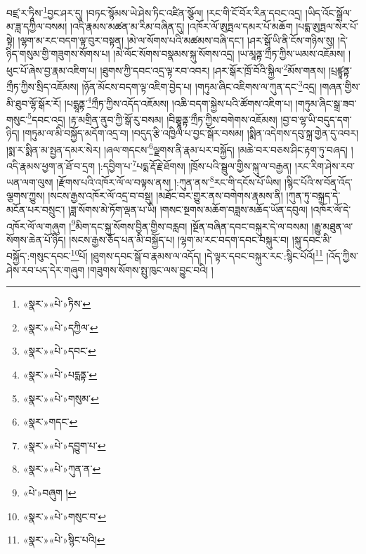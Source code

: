 བཛྲ་ར་ཏཱིས་\footnote{«སྣར་»«པེ་»ཏིས་}བྱང་ཤར་དུ། །བཏང་སྙོམས་ཡེ་ཤེས་ཏིང་འཛིན་སྩོལ། །རང་གི་ངོ་བོར་རིན་དབང་འདྲ། །ཡིད་འོང་སྒྲོལ་མ་ཟླ་དཀྱིལ་བསམ། །འདི་རྣམས་མཚན་མ་རིམ་བཞིན་དུ། །འཁོར་ལོ་ཨུཏྤལ་དམར་པོ་མཆོག །པདྨ་ཨུཏྤལ་སེར་པོ་སྟེ། །ལྷག་མ་རང་བདག་ལྟ་བུར་བསྟན། །མེ་ལ་སོགས་པའི་མཚམས་བཞི་དང་། །ཤར་སྒོ་ཡི་ནི་ངོས་གཉིས་སུ། །དེ་ཉིད་གསུམ་གྱི་གཟུགས་སོགས་པ། །མེ་ལོང་སོགས་བསྣམས་སྐུ་སོགས་འདྲ། །ཡ་མཱནྟ་ཀྲྀཏ་ཀྱིས་ཡམས་འཇོམས། །ཕུང་པོ་ཞེས་བྱ་རྣམ་འཇིག་པ། །ཐུགས་ཀྱི་དབང་འདྲ་ལྟ་རབ་འབར། །ཤར་སྒོར་ཁྲོ་བོའི་སྐྱིལ་\footnote{«སྣར་»«པེ་»དཀྱིལ་}མོས་གནས། །པྲཛྙཱནྟ་ཀྲྀཏ་ཀྱིས་སྲིད་འཇོམས། །ཉོན་མོངས་བདག་ལྟ་འཇིག་བྱེད་པ། །གཏུམ་ཞིང་འཇིགས་ལ་ཀུན་དང་\footnote{«སྣར་»«པེ་»དབང་}འདྲ། །གཞན་གྱིས་མི་ཐུབ་ལྷོ་སྒོར་རོ། །པདྨཱནྟ་\footnote{«སྣར་»«པེ་»པདྨནྟ་}ཀྲྀཏ་ཀྱིས་འདོད་འཇོམས། །འཆི་བདག་སྐྱེས་པའི་ཚོགས་འཇིག་པ། །གཏུམ་ཞིང་སྒྲ་ཟབ་གསུང་\footnote{«སྣར་»«པེ་»གསུམ་}དབང་འདྲ། །རྟ་མགྲིན་ནུབ་ཀྱི་སྒོ་རུ་བསམ། །བིགྷྣཱནྟ་ཀྲྀཏ་ཀྱིས་བགེགས་འཇོམས། །བྱ་བ་ལྷ་ཡི་བདུད་དག་ཉིད། །གཏུམ་ལ་མི་བསྐྱོད་མདོག་འདྲ་བ། །བདུད་རྩི་འཁྱིལ་པ་བྱང་སྒོར་བསམ། །སྨིན་འདེགས་དབུ་སྐྲ་གྱེན་དུ་འབར། །སྨ་ར་སྨིན་མ་སྤྱན་དམར་སེར། །ཞལ་གདངས་\footnote{«སྣར་»གདང་}ལྗགས་ནི་རྣམ་པར་བསྐྱོད། །མཆེ་བར་བཅས་ཤིང་རྟག་ཏུ་བཞད། །འདི་རྣམས་ཕྱག་ན་ཐོ་བ་དྲག །:དབྱིག་པ་\footnote{«སྣར་»«པེ་»དབྱུག་པ་}པདྨ་རྡོ་རྗེ་ཐོགས། །ཁྲོས་པའི་སྦྲུལ་གྱིས་སྐུ་ལ་བརྒྱན། །རང་རིག་ཤེས་རབ་ཡན་ལག་ལུས། །རྫོགས་པའི་འཁོར་ལོ་ལ་བལྟས་ནས། །:ཀུན་ནས་\footnote{«སྣར་»«པེ་»ཀུན་ན་}རང་གི་དངོས་པོ་ཡིས། །སྙིང་པོའི་ས་བོན་འོད་ལྕགས་ཀྱུས། །སངས་རྒྱས་འཁོར་ལོ་འདྲ་བ་བསྡུ། །མཐོང་བར་གྱུར་ནས་བགེགས་རྣམས་ནི། །ཀུན་ཏུ་བསྐྲད་དེ་མངོན་པར་བསྲུང་། །ཟླ་སོགས་མེ་ཏོག་ལྡན་པ་ཡི། །གསང་སྔགས་མཆོག་བཟླས་མཆོད་ཡོན་དབུལ། །འཁོར་ལོ་དེ་འཁོར་ལོ་ལ་གཞུག །\footnote{«པེ་»བཞུག །}མིག་དང་སྐུ་སོགས་བྱིན་གྱིས་བརླབ། །སྔོན་བཞིན་དབང་བསྐུར་དེ་ལ་བསམ། །རྒྱུ་མཐུན་ལ་སོགས་ཆེན་པོ་ཉིད། །སངས་རྒྱས་ཅོད་པན་མི་བསྐྱོད་པ། །ལྷག་མ་རང་བདག་དབང་བསྐུར་བ། །སྐུ་དབང་མི་བསྐྱོད་:གསུང་དབང་\footnote{«སྣར་»«པེ་»གསུང་བ་}པོ། །ཐུགས་དབང་སྒོ་བ་རྣམས་ལ་འདོད། །དེ་ལྟར་དབང་བསྐུར་རང་:སྙིང་པོའོ།\footnote{«སྣར་»«པེ་»སྙིང་པའི།} །འོད་ཀྱིས་ཤེས་རབ་པད་དེར་གཞུག །གཟུགས་སོགས་སྤུ་ཁུང་ལས་བྱུང་བའི། །
